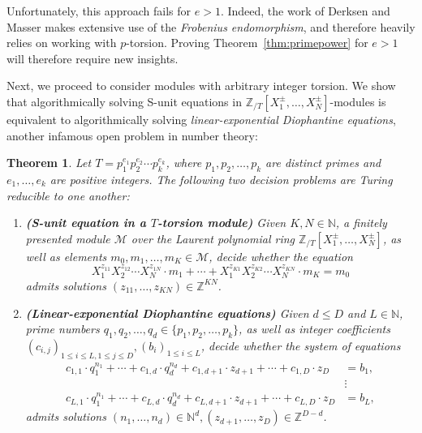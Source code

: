 \documentclass[letterpaper, 11pt, thm-restate]{article}
\numberwithin{equation}{section}
\newcommand{\Z}{\mathbb{Z}}
\newcommand{\N}{\mathbb{N}}
\newcommand{\ZT}{\mathbb{Z}_{/T}}
\newcommand{\mM}{\mathcal{M}}
\newtheorem{thrm}{Theorem}[section]
\theoremstyle{definition}
\theoremstyle{definition}
\theoremstyle{definition}
\begin{document}
Unfortunately, this approach fails for $e > 1$.
Indeed, the work of Derksen and Masser makes extensive use of the \emph{Frobenius endomorphism}, and therefore heavily relies on working with $p$-torsion.
Proving Theorem~\ref{thm:primepower} for $e > 1$ will therefore require new insights.

Next, we proceed to consider modules with arbitrary integer torsion.
We show that algorithmically solving S-unit equations in $\ZT[X_1^{\pm}, \ldots, X_N^{\pm}]$-modules is equivalent to algorithmically solving \emph{linear-exponential Diophantine equations}, another infamous open problem in number theory:

\begin{thrm}\label{thm:mainequiv}
    Let $T = p_1^{e_1} p_2^{e_2} \cdots p_k^{e_k}$, where $p_1, p_2, \ldots, p_k$ are distinct primes and $e_1, \ldots, e_k$ are positive integers. The following two decision problems are Turing reducible to one another:
    \begin{enumerate}[noitemsep, label = (\arabic*)]
        \item \textbf{(S-unit equation in a $T$-torsion module)} Given $K, N \in \N$, a finitely presented module $\mM$ over the Laurent polynomial ring $\ZT[X_1^{\pm}, \ldots, X_N^{\pm}]$, as well as elements $m_0, m_1, \ldots, m_K \in \mM$, decide whether the equation
        \begin{equation}\label{eq:Sunit}
        X_1^{z_{11}} X_2^{z_{12}} \cdots X_N^{z_{1N}} \cdot m_1 + \cdots + X_1^{z_{K1}} X_2^{z_{K2}} \cdots X_N^{z_{KN}} \cdot m_K = m_0
        \end{equation}
        admits solutions $(z_{11}, \ldots, z_{KN}) \in \Z^{KN}$.
        \item \textbf{(Linear-exponential Diophantine equations)} Given $d \leq D$ and $L \in \N$, prime numbers $q_1, q_2, \ldots, q_d \in \{p_1, p_2, \ldots, p_k\}$, as well as integer coefficients $(c_{i,j})_{1 \leq i \leq L, 1 \leq j \leq D}, (b_{i})_{1 \leq i \leq L}$, decide whether the system of equations
        \begin{align}\label{eq:linearpower}
            c_{1,1} \cdot q_1^{n_1} + \cdots + c_{1,d} \cdot q_d^{n_d} + c_{1,d+1} \cdot z_{d+1} + \cdots + c_{1, D} \cdot z_{D} & = b_1, \nonumber \\
            & \vdots \nonumber \\
            c_{L,1} \cdot q_1^{n_1} + \cdots + c_{L,d} \cdot q_d^{n_d} + c_{L,d+1} \cdot z_{d+1} + \cdots + c_{L, D} \cdot z_{D} & = b_L,
        \end{align}
        admits solutions $(n_1, \ldots, n_d) \in \N^d, (z_{d+1}, \ldots, z_D) \in \Z^{D-d}$.
    \end{enumerate}
\end{thrm}
\end{document}
